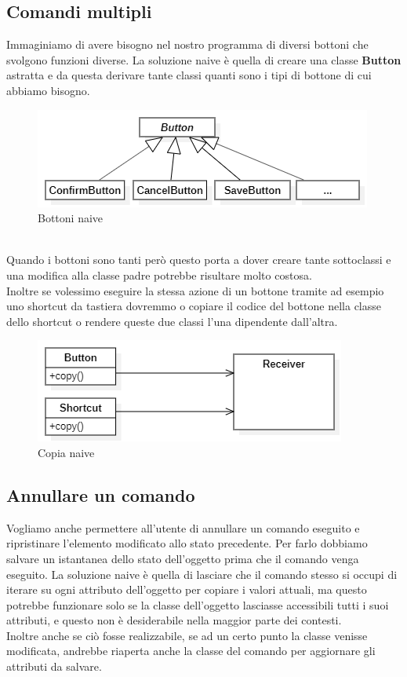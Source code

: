 \documentclass[12pt]{article}
\begin{document}
\subsection{Comandi multipli}
Immaginiamo di avere bisogno nel nostro programma di diversi bottoni che svolgono funzioni diverse. La soluzione naive è quella di creare una classe \textbf{Button} astratta e da questa derivare tante classi quanti sono i tipi di bottone di cui abbiamo bisogno.
\begin{figure}[h!]
\centering
\includegraphics[scale=0.8]{naiveButtons}
\caption{Bottoni naive}
\label{fig:naiveButtons}
\end{figure}
\\Quando i bottoni sono tanti però questo porta a dover creare tante sottoclassi e una modifica alla classe padre potrebbe risultare molto costosa.\\
Inoltre se volessimo eseguire la stessa azione di un bottone tramite ad esempio uno shortcut da tastiera dovremmo o copiare il codice del bottone nella classe dello shortcut o rendere queste due classi l'una dipendente dall'altra.
\begin{figure}[h!]
\centering
\includegraphics[scale=0.8]{commandNaive.png}
\caption{Copia naive}
\label{fig:naiveCopy}
\end{figure}

\subsection{Annullare un comando}\label{undo}
Vogliamo anche permettere all'utente di annullare un comando eseguito e ripristinare l'elemento modificato allo stato precedente. Per farlo dobbiamo salvare un istantanea dello stato dell'oggetto prima che il comando venga eseguito. La soluzione naive è quella di lasciare che il comando stesso si occupi di iterare su ogni attributo dell'oggetto per copiare i valori attuali, ma questo potrebbe funzionare solo se la classe dell'oggetto lasciasse accessibili tutti i suoi attributi, e questo non è desiderabile nella maggior parte dei contesti. \\
Inoltre anche se ciò fosse realizzabile, se ad un certo punto la classe venisse modificata, andrebbe riaperta anche la classe del comando per aggiornare gli attributi da salvare.
\end{document}
